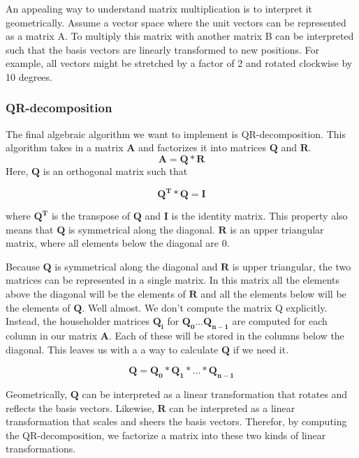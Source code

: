 An appealing way to understand matrix multiplication is to interpret it geometrically. Assume a vector space where the unit vectors can be represented as a matrix A. To multiply this matrix with another matrix B can be interpreted such that the basis vectors are linearly transformed to new positions. For example, all vectors might be stretched by a factor of 2 and rotated clockwise by 10 degrees. 


\subsubsection{QR-decomposition}
The final algebraic algorithm we want to implement is QR-decomposition. This algorithm takes in a matrix \(\mathbf{A}\) and factorizes it into matrices \(\mathbf{Q}\) and \(\mathbf{R}\). 
\[\mathbf{A} = \mathbf{Q} * \mathbf{R}\]
Here, \(\mathbf{Q}\) is an orthogonal matrix such that 

\[\mathbf{Q^T * Q = I}\]

where \(\mathbf{Q^T}\) is the transpose of \(\mathbf{Q}\) and \(\mathbf{I}\) is the identity matrix. This property also means that \(\mathbf{Q}\) is symmetrical along the diagonal. \(\mathbf{R}\) is an upper triangular matrix, where all elements below the diagonal are 0. 

Because \(\mathbf{Q}\) is symmetrical along the diagonal and \(\mathbf{R}\) is upper triangular, the two matrices can be represented in a single matrix. In this matrix all the elements above the diagonal will be the elements of \(\mathbf{R}\) and all the elements below will be the elements of \(\mathbf{Q}\). Well almost. We don't compute the matrix Q explicitly. Instead, the householder matrices \(\mathbf{Q_i}\) for \(\mathbf{Q_0 \ldots Q_{n-1}}\) are computed for each column in our matrix \(\mathbf{A}\). Each of these will be stored in the columns below the diagonal. This leaves us with a a way to calculate \(\mathbf{Q}\) if we need it. 

\[\mathbf{Q = Q_0 * Q_1 * \ldots * Q_{n-1}}\]

Geometrically, \(\mathbf{Q}\) can be interpreted as a linear transformation that rotates and reflects the basis vectors. Likewise, \(\mathbf{R}\) can be interpreted as a linear transformation that scales and sheers the basis vectors. Therefor, by computing the QR-decomposition, we factorize a matrix into these two kinds of linear transformations. 


